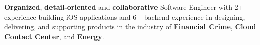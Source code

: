 
\begin{cvparagraph}
    \textbf{Organized}, \textbf{detail-oriented} and \textbf{collaborative} Software Engineer with 2+ experience building iOS applications and 6+ backend experience in designing, delivering, and supporting products in the industry of \textbf{Financial Crime}, \textbf{Cloud Contact Center}, and \textbf{Energy}.
\end{cvparagraph}




